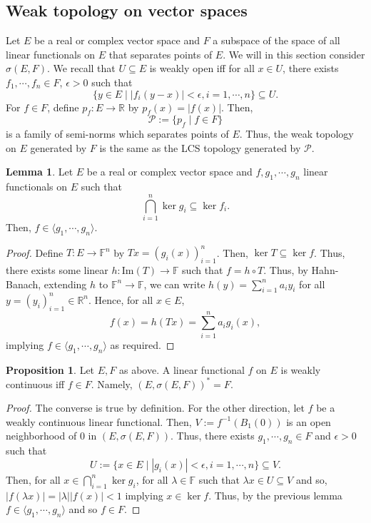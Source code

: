 \documentclass[]{article}
\theoremstyle{definition}
\newtheorem{lemma}{Lemma}[section]
\newtheorem{proposition}{Proposition}[section]
\begin{document}
\subsection{Weak topology on vector spaces}

Let \(E\) be a real or complex vector space and \(F\) a subspace of the space of all linear functionals 
on \(E\) that separates points of \(E\). We will in this section consider \(\sigma(E, F)\). 
We recall that \(U \subseteq E\) is weakly open iff for all \(x \in U\), there exists 
\(f_1, \cdots, f_n \in F\), \(\epsilon > 0\) such that 
\[\{y \in E \mid |f_i(y - x)| < \epsilon, i = 1, \cdots, n\} \subseteq U.\]
For \(f \in F\), define \(p_f : E \to \mathbb{R}\) by \(p_f(x) = |f(x)|\). Then, 
\[\mathcal{P} := \{p_f \mid f \in F\}\]
is a family of semi-norms which separates points of \(E\). Thus, the weak topology on \(E\) generated 
by \(F\) is the same as the LCS topology generated by \(\mathcal{P}\).

\begin{lemma}
  Let \(E\) be a real or complex vector space and \(f, g_1, \cdots, g_n\) linear functionals on \(E\) 
  such that 
  \[\bigcap_{i = 1}^n \ker g_i \subseteq \ker f_i.\]
  Then, \(f \in \langle g_1, \cdots, g_n \rangle\).
\end{lemma}
\begin{proof}
  Define \(T : E \to \mathbb{F}^n\) by \(Tx = (g_i(x))_{i = 1}^n\). Then, \(\ker T \subseteq \ker f\).
  Thus, there exists some linear \(h : \text{Im}(T) \to \mathbb{F}\) such that \(f = h \circ T\). Thus, 
  by Hahn-Banach, extending \(h\) to \(\mathbb{F}^n \to \mathbb{F}\), we can write 
  \(h(y) = \sum_{i = 1}^n a_i y_i\) for all \(y = (y_i)_{i = 1}^n \in \mathbb{R}^n\). Hence, 
  for all \(x \in E\), 
  \[f(x) = h(Tx) = \sum_{i = 1}^n a_i g_i(x),\]
  implying \(f \in \langle g_1, \cdots, g_n \rangle\) as required.
\end{proof}

\begin{proposition}
  Let \(E, F\) as above. A linear functional \(f\) on \(E\) is weakly continuous iff \(f \in F\).
  Namely, \((E, \sigma(E, F))^* = F\).
\end{proposition}
\begin{proof}
  The converse is true by definition. For the other direction, let \(f\) be a weakly continuous linear 
  functional. Then, \(V := f^{-1}(B_1(0))\) is an open neighborhood of \(0\) in \((E, \sigma(E, F))\).
  Thus, there exists \(g_1, \cdots, g_n \in F\) and \(\epsilon > 0\) such that 
  \[U := \{x \in E \mid |g_i(x)| < \epsilon, i = 1, \cdots, n\} \subseteq V.\]
  Then, for all \(x \in \bigcap_{i = 1}^n \ker g_i\), for all \(\lambda \in \mathbb{F}\) 
  such that \(\lambda x \in U \subseteq V\) and so, \(|f(\lambda x)| = |\lambda| |f(x)| < 1\) 
  implying \(x \in \ker f\). Thus, by the previous lemma \(f \in \langle g_1, \cdots, g_n \rangle\) 
  and so \(f \in F\).
\end{proof}
\end{document}
